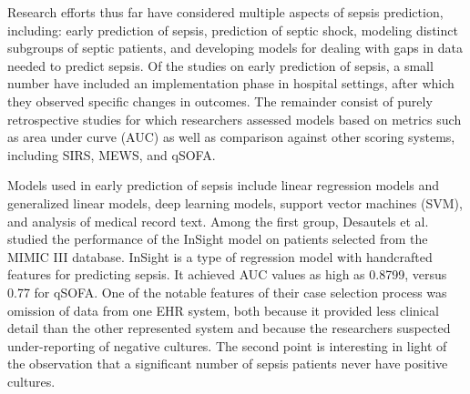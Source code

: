 \documentclass{amia}
\begin{document}
	 Research efforts thus far have considered multiple aspects
	of sepsis prediction, including: early prediction of
	sepsis,\cite{desautels2016,futoma2017,guirgis2017,horng2017,kam2017,manaktala2016,mccoy2017}
	prediction of septic shock,\cite{henry2015} modeling distinct
	subgroups of septic patients,\cite{rothman2017} and developing
	models for dealing with gaps in data needed to predict
	sepsis.\cite{mayhew2018} 
	 Of the studies on early prediction of sepsis, a small number
	have included an implementation phase in hospital settings, 
	after which they observed specific changes in outcomes.\cite{manaktala2016,mccoy2017}
	 The remainder consist of purely retrospective studies for
	which researchers assessed models based on metrics such as
	area under curve (AUC) as well as comparison against other
	scoring systems, including SIRS, MEWS, and
	qSOFA.\cite{futoma2017,guirgis2017,horng2017,kam2017}

	 Models used in early prediction of sepsis include linear
	regression models\cite{desautels2016,kam2017,rothman2017}
	and generalized linear models,\cite{guirgis2017} deep
	learning models,\cite{futoma2017,kam2017} 
	support vector machines (SVM),\cite{horng2017} and 
        analysis of medical record text.\cite{horng2017} Among the first group, 
        Desautels et al.\cite{desautels2016} 
	studied the performance of the InSight model on patients 
	selected from the MIMIC III database.  
	 InSight is a type of regression model with handcrafted features 
	for predicting sepsis.\cite{kam2017}
	 It achieved AUC values as high as 0.8799, versus 0.77 for
	qSOFA.  
	 One of the notable features of their case selection
	process was omission of data from one EHR system, both
	because it provided less clinical detail than the other
	represented system and because the researchers suspected
	under-reporting of negative cultures.  
	 The second point is interesting in light of the observation 
	that a significant number of sepsis patients never have positive
	cultures.\cite{coopersmith2018}
\end{document}
